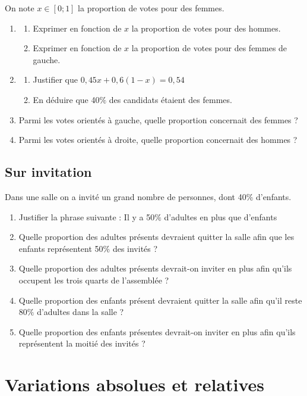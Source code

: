 \documentclass[oneside,12pt]{article}          %
\begin{document}
On note $x\in[0;1]$ la proportion de votes pour des femmes.
\begin{enumerate}
    \item \begin{enumerate}
        \item Exprimer en fonction de $x$ la proportion de votes pour des hommes.
        \item Exprimer en fonction de $x$ la proportion de votes pour des femmes de gauche.
    \end{enumerate}
    \item \begin{enumerate}
        \item Justifier que $0,45x+0,6(1-x)=0,54$
        \item En déduire que 40$\%$ des candidats étaient des femmes.
    \end{enumerate}
    \item Parmi les votes orientés à gauche, quelle proportion concernait des femmes ?
    \item Parmi les votes orientés à droite, quelle proportion concernait des hommes ?
\end{enumerate}



\subsection{Sur invitation}
Dans une salle on a invité un grand nombre de personnes, dont 40$\%$ d'enfants.
\begin{enumerate}
    \item Justifier la phrase suivante : \og Il y a 50$\%$ d'adultes en plus que d'enfants \fg
    \item Quelle proportion des adultes présents devraient quitter la salle afin que les enfants représentent 50$\%$ des invités ?
    \item Quelle proportion des adultes présents devrait-on inviter en plus afin qu'ils occupent les trois quarts de l'assemblée ?
    \item  Quelle proportion des enfants présent devraient quitter la salle afin qu'il reste 80$\%$ d'adultes dans la salle ?
    \item  Quelle proportion des enfants présentes devrait-on inviter en plus afin qu'ils représentent la moitié des invités ?
\end{enumerate}



\section{Variations absolues et relatives}
\end{document}

